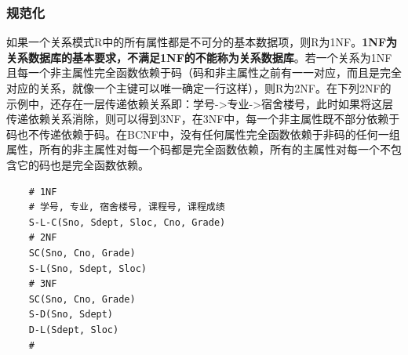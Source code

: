 \documentclass[chapter.computer_science.tex]{subfiles}
\begin{document}
\subsubsection{规范化}
如果一个关系模式R中的所有属性都是不可分的基本数据项，则R为1NF。{\bfseries 1NF为关系数据库的基本要求，不满足1NF的不能称为关系数据库}。若一个关系为1NF且每一个非主属性完全函数依赖于码（码和非主属性之前有一一对应，而且是完全对应的关系，就像一个主键可以唯一确定一行这样），则R为2NF。在下列2NF的示例中，还存在一层传递依赖关系即：学号->专业->宿舍楼号，此时如果将这层传递依赖关系消除，则可以得到3NF，在3NF中，每一个非主属性既不部分依赖于码也不传递依赖于码。在BCNF中，没有任何属性完全函数依赖于非码的任何一组属性，所有的非主属性对每一个码都是完全函数依赖，所有的主属性对每一个不包含它的码也是完全函数依赖。\\
\begin{verbatim}
    # 1NF
    # 学号, 专业, 宿舍楼号, 课程号, 课程成绩
    S-L-C(Sno, Sdept, Sloc, Cno, Grade)
    # 2NF
    SC(Sno, Cno, Grade)
  	S-L(Sno, Sdept, Sloc)
    # 3NF
    SC(Sno, Cno, Grade)
    S-D(Sno, Sdept)
    D-L(Sdept, Sloc)
    #
\end{verbatim}
\end{document}
